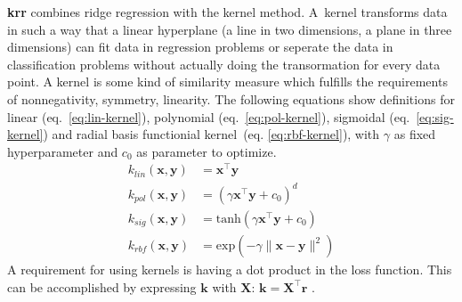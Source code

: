 \textbf{\gls{krr}} combines ridge regression with the kernel method. 
A~kernel transforms data in such a way that a linear hyperplane (a line in two dimensions, 
a plane in three dimensions) can fit data in regression problems or seperate the data in classification problems without actually doing the transormation for every data point. 
A kernel is some kind of similarity measure 
which fulfills the requirements of nonnegativity, symmetry, linearity\cite{rupp2015machine}.
The following equations show definitions for 
linear (eq.~\ref{eq:lin-kernel}), 
polynomial (eq.~\ref{eq:pol-kernel}), 
sigmoidal (eq.~\ref{eq:sig-kernel}) and 
radial basis functionial kernel~(eq. \ref{eq:rbf-kernel}), with $\gamma$ as fixed hyperparameter and $c_0$ as parameter to optimize.
\begin{align}
    \label{eq:lin-kernel}
    k_{lin}(\mathbf{x},\mathbf{y}) &= \mathbf{x}^{\top} \mathbf{y} \\
    \label{eq:pol-kernel}
    k_{pol}(\mathbf{x}, \mathbf{y}) &= (\gamma \mathbf{x}^{\top} \mathbf{y} + c_0)^d \\
    \label{eq:sig-kernel}
    k_{sig}(\mathbf{x}, \mathbf{y}) &= \text{tanh}(\gamma \mathbf{x}^{\top} \mathbf{y} + c_0) \\
    \label{eq:rbf-kernel}
    k_{rbf}(\mathbf{x}, \mathbf{y}) &= \text{exp}(- \gamma \| \mathbf{x} -  \mathbf{y} \|^2) 
\end{align}
A requirement for using kernels is having a dot product in the loss function. 
This can be accomplished by expressing $\mathbf{k}$ with $\mathbf{X}$: $\mathbf{k}=\mathbf{X}^\top \mathbf{r}$
\cite{rudin2020least}.

